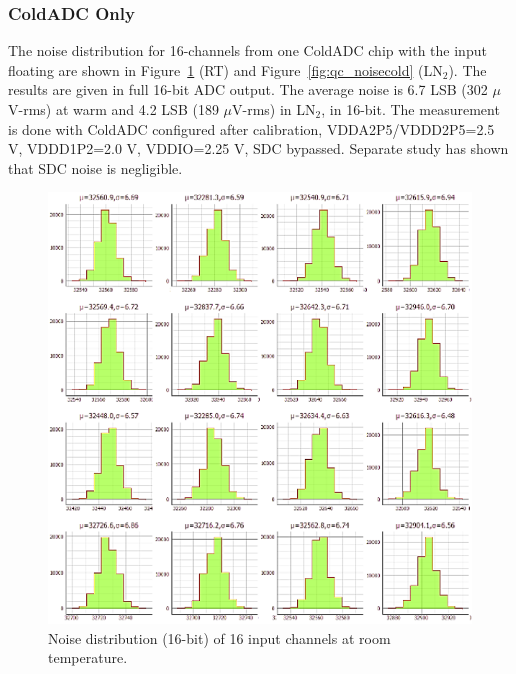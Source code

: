 \label{sec:4.1}


\subsubsection{ColdADC Only}
The noise distribution for 16-channels from one ColdADC chip with the input floating are shown in Figure~\ref{fig:qc_noisewarm} (RT) and Figure~\ref{fig:qc_noisecold} (LN$_2$). The results are given in full 16-bit ADC output. The average noise is 6.7 LSB (302 $\mu$V-rms) at warm and 4.2 LSB (189 $\mu$V-rms) in LN$_2$, in 16-bit. The measurement is done with ColdADC configured after calibration, VDDA2P5/VDDD2P5=2.5 V, VDDD1P2=2.0 V, VDDIO=2.25 V, SDC bypassed. Separate study has shown that SDC noise is negligible. 
\begin{figure}[h!]
\centering
  \includegraphics[width=0.8\linewidth]{figures/qc_noisewarm.png}
  \caption{Noise distribution (16-bit) of 16 input channels at room temperature.}
  \label{fig:qc_noisewarm}
\end{figure}

